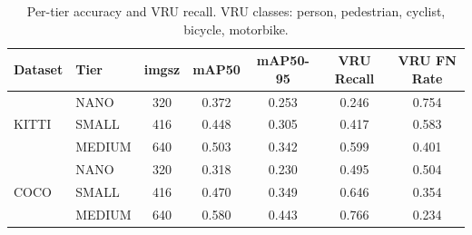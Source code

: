 \begin{table}[t]
\centering
\caption{Per-tier accuracy and VRU recall. VRU classes: person, pedestrian, cyclist, bicycle, motorbike.}
\label{tab:accuracy_per_tier}
\begin{tabular}{llccccc}
\toprule
Dataset & Tier & imgsz & mAP50 & mAP50-95 & VRU Recall & VRU FN Rate \\
\midrule
\multirow{3}{*}{KITTI} & NANO & 320 & 0.372 & 0.253 & 0.246 & 0.754 \\
 & SMALL & 416 & 0.448 & 0.305 & 0.417 & 0.583 \\
 & MEDIUM & 640 & 0.503 & 0.342 & 0.599 & 0.401 \\
\midrule
\multirow{3}{*}{COCO} & NANO & 320 & 0.318 & 0.230 & 0.495 & 0.504 \\
 & SMALL & 416 & 0.470 & 0.349 & 0.646 & 0.354 \\
 & MEDIUM & 640 & 0.580 & 0.443 & 0.766 & 0.234 \\
\bottomrule
\end{tabular}
\end{table}